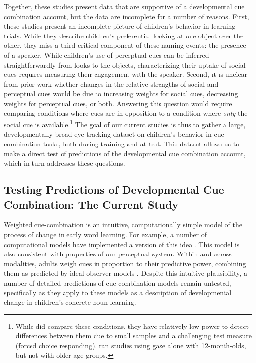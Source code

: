\documentclass[man,floatsintext]{apa6}
\begin{document}
Together, these studies present data that are supportive of a developmental cue combination account, but the data are incomplete for a number of reasons. First, these studies present an incomplete picture of children's behavior in learning trials. While they describe children's preferential looking at one object over the other, they miss a third critical component of these naming events: the presence of a speaker. While children's use of perceptual cues can be inferred straightforwardly from looks to the objects, characterizing their uptake of social cues requires measuring their engagement with the speaker. Second, it is unclear from prior work whether changes in the relative strengths of social and perceptual cues would be due to increasing weights for social cues, decreasing weights for perceptual cues, or both. Answering this question would require comparing conditions where cues are in opposition to a condition where \emph{only} the social cue is available.\footnote{While  did compare these conditions, they have relatively low power to detect differences between them due to small samples and a challenging test measure (forced choice responding).  ran studies using gaze alone with 12-month-olds, but not with older age groups.} The goal of our current studies is thus to gather a large, developmentally-broad eye-tracking dataset on children's behavior in cue-combination tasks, both during training and at test. This dataset allows us to make a direct test of predictions of the developmental cue combination account, which in turn addresses these questions.

\subsection{Testing Predictions of Developmental Cue Combination: The Current Study}

Weighted cue-combination is an intuitive, computationally simple model of the process of change in early word learning. For example, a number of computational models have implemented a version of this idea  \cite{Frank2007b,Frank2013a}. This model is also consistent with properties of our perceptual system: Within and across modalities, adults weigh cues in proportion to their predictive power, combining them as predicted by ideal observer models \cite{Ernst2002, Jacobs2002}. Despite this intuitive plausibility, a number of detailed predictions of cue combination models remain untested, specifically as they apply to these models as a description of developmental change in children's concrete noun learning. 
\end{document}

